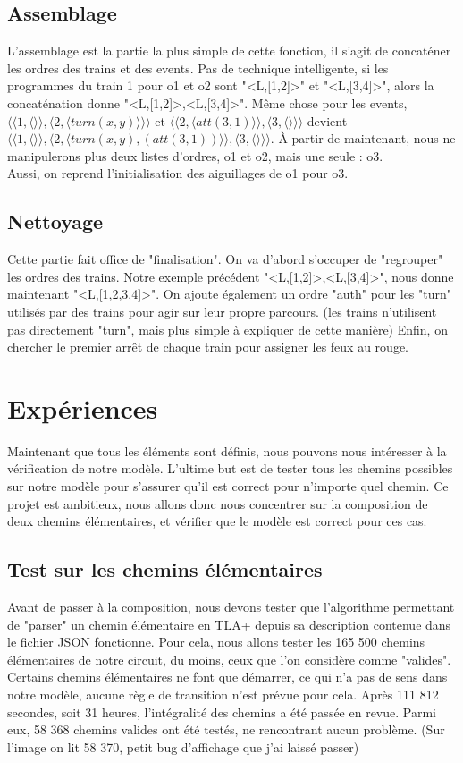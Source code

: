 \documentclass[runningheads]{llncs}
\newcommand{\tuple}[1]{\ensuremath{\langle #1\rangle}}
\begin{document}
\subsection{Assemblage}
L'assemblage est la partie la plus simple de cette fonction, il s'agit de concaténer les ordres des trains et des events.
Pas de technique intelligente, si les programmes du train 1 pour o1 et o2 sont "<L,[1,2]>" et "<L,[3,4]>", alors la concaténation donne "<L,[1,2]>,<L,[3,4]>".
Même chose pour les events, \tuple{\tuple{1,\tuple{}},\tuple{2,\tuple{turn(x,y)}}} et \tuple{\tuple{2,\tuple{att(3,1)}},\tuple{3,\tuple{}}} devient \tuple{\tuple{1,\tuple{}},\tuple{2,\tuple{turn(x,y),(att(3,1))}},\tuple{3,\tuple{}}}.
À partir de maintenant, nous ne manipulerons plus deux listes d'ordres, o1 et o2, mais une seule : o3. 
\\Aussi, on reprend l'initialisation des aiguillages de o1 pour o3.

\subsection{Nettoyage}
Cette partie fait office de "finalisation". On va d'abord s'occuper de "regrouper" les ordres des trains. Notre exemple précédent "<L,[1,2]>,<L,[3,4]>", nous donne maintenant "<L,[1,2,3,4]>". 
On ajoute également un ordre "auth" pour les "turn" utilisés par des trains pour agir sur leur propre parcours. (les trains n'utilisent pas directement "turn", mais plus simple à expliquer de cette manière)
Enfin, on chercher le premier arrêt de chaque train pour assigner les feux au rouge.

\section{Expériences}
\label{sec:experiments}

Maintenant que tous les éléments sont définis, nous pouvons nous intéresser à la vérification de notre modèle.
L'ultime but est de tester tous les chemins possibles sur notre modèle pour s'assurer qu'il est correct pour n'importe quel chemin.
Ce projet est ambitieux, nous allons donc nous concentrer sur la composition de deux chemins élémentaires, et vérifier que le modèle est correct pour ces cas.

\subsection{Test sur les chemins élémentaires}
Avant de passer à la composition, nous devons tester que l'algorithme permettant de "parser" un chemin élémentaire en TLA+ depuis sa description contenue dans le fichier JSON fonctionne.
Pour cela, nous allons tester les 165 500 chemins élémentaires de notre circuit, du moins, ceux que l'on considère comme "valides".
Certains chemins élémentaires ne font que démarrer, ce qui n'a pas de sens dans notre modèle, aucune règle de transition n'est prévue pour cela.
Après 111 812 secondes, soit 31 heures, l'intégralité des chemins a été passée en revue. Parmi eux, 58 368 chemins valides ont été testés, ne rencontrant aucun problème. (Sur l'image on lit 58 370, petit bug d'affichage que j'ai laissé passer)  
\end{document}
